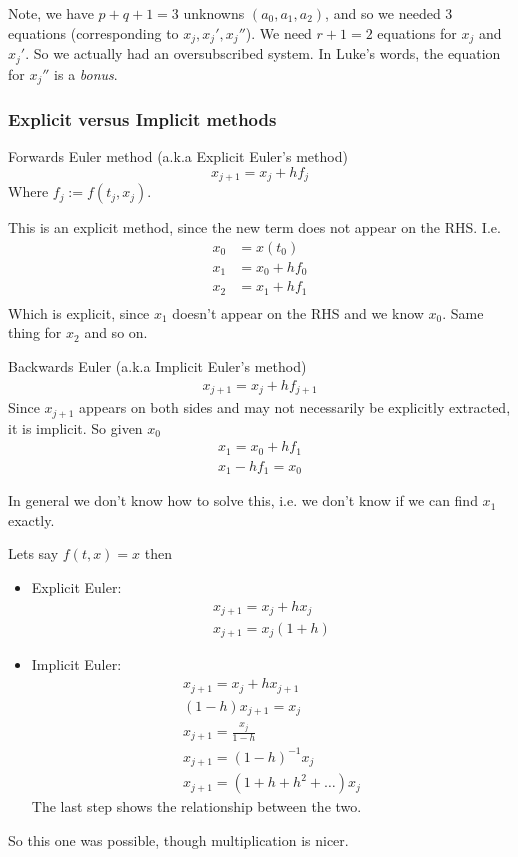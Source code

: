 \documentclass{X:/Documents/Coding/Latex/myassignment}
\begin{document}
Note, we have $p+q+1 = 3$ unknowns $(a_0,a_1,a_2)$, and so we needed 3 equations (corresponding to $x_j,x_j',x_j''$). We need $r+1 =2$ equations for $x_j$ and $x_j'$. So we actually had an oversubscribed system. In Luke's words, the equation for $x_j''$ is a \textit{bonus}.   


\subsubsection{Explicit versus Implicit methods}

Forwards Euler method (a.k.a Explicit Euler's method)
\[x_{j+1} = x_j + h f_j\]
Where $f_j := f(t_j,x_j)$.

This is an explicit method, since the new term does not appear on the RHS. I.e.
\begin{align*}
    x_0 &= x(t_0)\\
    x_1 &= x_0 + h f_0\\
    x_2 &= x_1 + h f_1\\
\end{align*}
Which is explicit, since $x_1$ doesn't appear on the RHS and we know $x_0$. Same thing for $x_2$ and so on.


Backwards Euler (a.k.a Implicit Euler's method)
\begin{align*}
    x_{j+1} = x_{j} + hf_{j+1}
\end{align*}
Since $x_{j+1}$ appears on both sides and may not necessarily be explicitly extracted, it is implicit.
So given $x_0$
\begin{align*}
    x_1 = x_0 + hf_1\\
    x_1 - hf_1 = x_0
\end{align*}

In general we don't know how to solve this, i.e. we don't know if we can find $x_1$ exactly.


Lets say $f(t,x) = x$ then
\begin{itemize}
    \item Explicit Euler:
    \begin{align*}
        x_{j+1} = x_j + h x_j\\
        x_{j+1} = x_j(1+h)
    \end{align*}
    \item Implicit Euler:
    \begin{align*}
        x_{j+1} = x_j + hx_{j+1}\\
        (1-h)x_{j+1} = x_j\\
        x_{j+1} = \frac{x_j}{1-h}\\
        x_{j+1} = (1-h)^{-1} x_j\\
        x_{j+1} = (1+h+h^2+\hdots) x_j
    \end{align*}
    The last step shows the relationship between the two.
\end{itemize}
So this one was possible, though multiplication is nicer.
\end{document}
